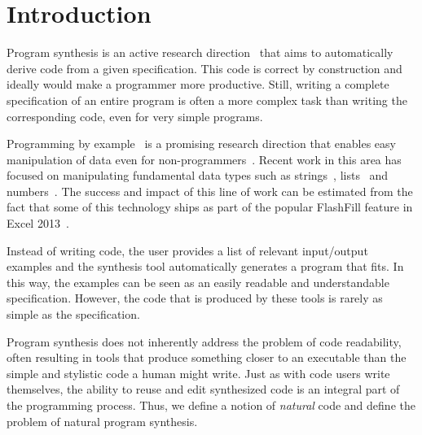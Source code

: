 \section{Introduction}
\label{intro}

Program synthesis is an active research direction~\cite{DBLP:journals/toplas/MannaW80, DBLP:journals/cacm/GulwaniHS12,DBLP:conf/icfp/Bodik15, DBLP:conf/pldi/KuncakMPS10, DBLP:conf/aplas/Solar-Lezama09, DBLP:conf/pldi/SrivastavaGCF11} that aims to automatically derive code from a given specification.
This code is correct by construction and ideally would make a programmer more productive.
Still, writing a complete specification of an entire program is often a more complex task than writing the corresponding code, even for very simple programs.

Programming by example~\cite{cypher93,lieberman01,synasc12} is a promising research direction that enables easy manipulation of data even for non-programmers~\cite{GulwaniHS12}.
Recent work in this area has focused on manipulating fundamental data types such as strings~\cite{flashFillPOPL,vldb12,icml13}, lists~\cite{FeserCD15,Osera:2015} and numbers~\cite{cav12}.
The success and impact of this line of work can be estimated from the fact that some of this technology ships as part of the popular FlashFill feature in Excel 2013~\cite{flashFillPOPL}.

Instead of writing code, the user provides a list of relevant input/output examples and the synthesis tool automatically generates a program that fits.
In this way, the examples can be seen as an easily readable and understandable specification.
However, the code that is produced by these tools is rarely as simple as the specification.

Program synthesis does not inherently address the problem of code readability, often resulting in tools that produce something closer to an executable than the simple and stylistic code a human might write.
Just as with code users write themselves, the ability to reuse and edit synthesized code is an integral part of the programming process.
Thus, we define a notion of \textit{natural} code and define the problem of natural program synthesis.

